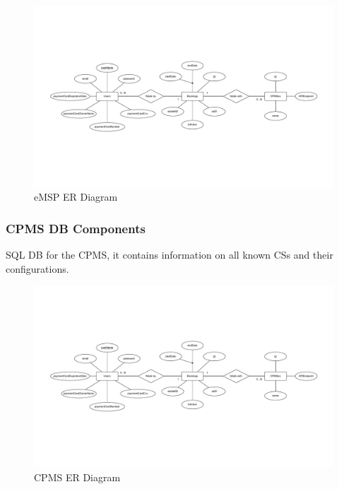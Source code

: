 \documentclass[11pt]{article}
\begin{document}
\begin{figure}[!ht]
    \centering
    \includegraphics[page={1}, trim=1.5cm 6cm 1.5cm 6cm, width=\linewidth, clip]{ERDiagrams.pdf}
    \caption{eMSP ER Diagram}
\end{figure}

\subsubsection{CPMS DB Components}

SQL DB for the CPMS, it contains information on all known CSs and their configurations.

\begin{figure}[!ht]
    \centering
    \includegraphics[page={2}, trim=5cm 3.5cm 5cm 3.5cm, width=\linewidth, clip]{ERDiagrams.pdf}
    \caption{CPMS ER Diagram}
\end{figure}

\newpage
\end{document}
